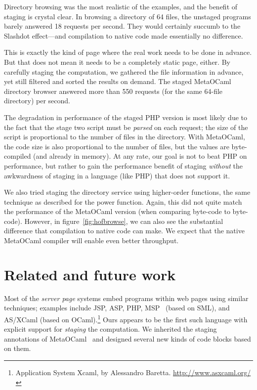 \documentclass{elsart}
\def\MOC{MetaOCaml\xspace}
\begin{document}
Directory browsing was the most realistic of the examples, and the
benefit of staging is crystal clear.  In browsing a directory of 64
files, the unstaged programs barely answered 18 requests per second.
They would certainly succumb to the Slashdot effect---and compilation
to native code made essentially no difference.

This is exactly the kind of page where the real work needs to be done
in advance.  But that does not mean it needs to be a completely static
page, either.  By carefully staging the computation, we gathered the
file information in advance, yet still filtered and sorted the results
on demand.  The staged \MOC directory browser answered more than 550
requests (for the same 64-file directory) per second.

The degradation in performance of the staged PHP version is most
likely due to the fact that the stage two script must be \emph{parsed}
on each request; the size of the script is proportional to the number
of files in the directory.  With \MOC, the code size is also
proportional to the number of files, but the values are byte-compiled
(and already in memory).  At any rate, our goal is not to beat PHP on
performance, but rather to gain the performance benefit of staging
\emph{without} the awkwardness of staging in a language (like PHP) that
does not support it.

We also tried staging the directory service using higher-order
functions, the same technique as described for the power function.
Again, this did not quite match the performance of the \MOC version
(when comparing byte-code to byte-code).  However, in
figure~\ref{fig:hofbrowse}, we can also see the substantial difference
that compilation to native code can make.  We expect that the native
\MOC compiler will enable even better throughput.


\section{Related and future work}
\label{sec:related}

Most of the \emph{server page} systems embed programs within web pages
using similar techniques; examples include JSP, ASP, PHP,
MSP~\cite{elsman03web} (based on SML), and AS/XCaml (based on
OCaml).\footnote{Application System Xcaml, by Alessandro Baretta.
  \url{http://www.asxcaml.org/}}
Ours appears to be the first such language with
explicit support for \emph{staging} the computation.  We inherited the
staging annotations of \MOC~\cite{calcagno03meta} and designed several
new kinds of code blocks based on them.
\end{document}
